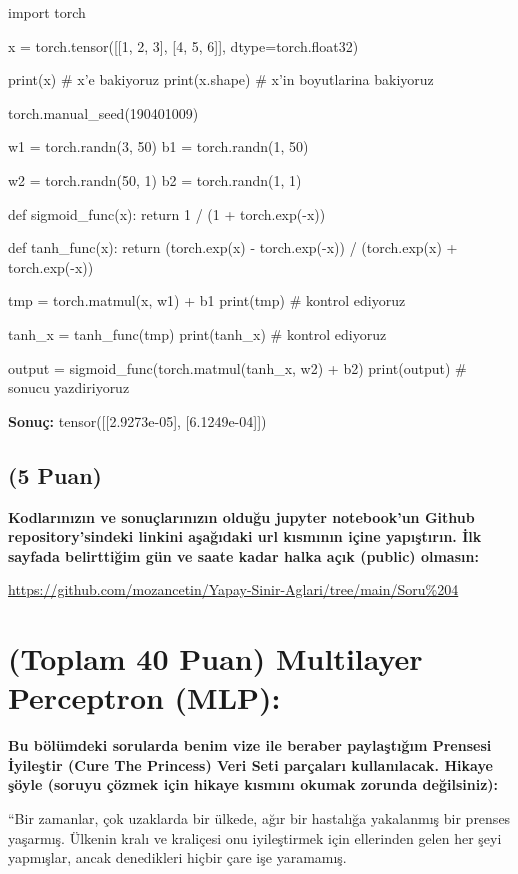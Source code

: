\documentclass[11pt]{article}
\begin{document}
\begin{python}
import torch

x = torch.tensor([[1, 2, 3], [4, 5, 6]], dtype=torch.float32)

print(x) # x'e bakiyoruz
print(x.shape) # x'in boyutlarina bakiyoruz

torch.manual_seed(190401009)

w1 = torch.randn(3, 50)
b1 = torch.randn(1, 50)

w2 = torch.randn(50, 1)
b2 = torch.randn(1, 1)

def sigmoid_func(x):
    return 1 / (1 + torch.exp(-x))

def tanh_func(x):
    return (torch.exp(x) - torch.exp(-x)) / (torch.exp(x) + torch.exp(-x))

tmp = torch.matmul(x, w1) + b1
print(tmp)  # kontrol ediyoruz

tanh_x = tanh_func(tmp)
print(tanh_x) # kontrol ediyoruz

output = sigmoid_func(torch.matmul(tanh_x, w2) + b2)
print(output) # sonucu yazdiriyoruz
\end{python}

\textbf{Sonuç:} tensor([[2.9273e-05], [6.1249e-04]])

\subsection{(5 Puan)} \textbf{Kodlarınızın ve sonuçlarınızın olduğu jupyter notebook'un Github repository'sindeki linkini aşağıdaki url kısmının içine yapıştırın. İlk sayfada belirttiğim gün ve saate kadar halka açık (public) olmasın:}

\url{https://github.com/mozancetin/Yapay-Sinir-Aglari/tree/main/Soru%204}

\section{(Toplam 40 Puan) Multilayer Perceptron (MLP):} 
\textbf{Bu bölümdeki sorularda benim vize ile beraber paylaştığım Prensesi İyileştir (Cure The Princess) Veri Seti parçaları kullanılacak. Hikaye şöyle (soruyu çözmek için hikaye kısmını okumak zorunda değilsiniz):} 

``Bir zamanlar, çok uzaklarda bir ülkede, ağır bir hastalığa yakalanmış bir prenses yaşarmış. Ülkenin kralı ve kraliçesi onu iyileştirmek için ellerinden gelen her şeyi yapmışlar, ancak denedikleri hiçbir çare işe yaramamış.
\end{document}

